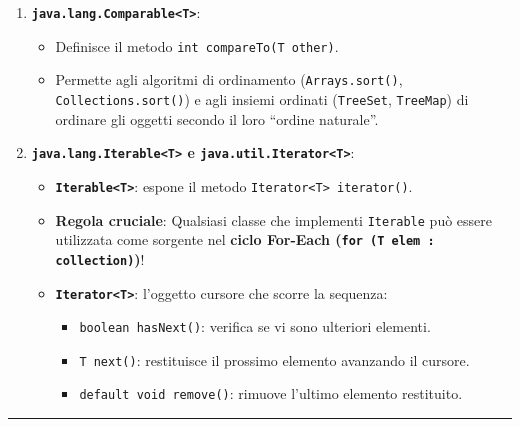 \documentclass[11pt,a4paper,oneside]{report}
\newcommand{\passthrough}[1]{#1}
\providecommand{\tightlist}{\setlength{\itemsep}{0pt}\setlength{\parskip}{0pt}}
\begin{document}
\begin{enumerate}
\def\labelenumi{\arabic{enumi}.}
\tightlist
\item
  \textbf{\passthrough{\lstinline!java.lang.Comparable<T>!}}:

  \begin{itemize}
  \tightlist
  \item
    Definisce il metodo
    \passthrough{\lstinline!int compareTo(T other)!}.
  \item
    Permette agli algoritmi di ordinamento
    (\passthrough{\lstinline!Arrays.sort()!},
    \passthrough{\lstinline!Collections.sort()!}) e agli insiemi
    ordinati (\passthrough{\lstinline!TreeSet!},
    \passthrough{\lstinline!TreeMap!}) di ordinare gli oggetti secondo
    il loro ``ordine naturale''.
  \end{itemize}
\item
  \textbf{\passthrough{\lstinline!java.lang.Iterable<T>!} e
  \passthrough{\lstinline!java.util.Iterator<T>!}}:

  \begin{itemize}
  \tightlist
  \item
    \textbf{\passthrough{\lstinline!Iterable<T>!}}: espone il metodo
    \passthrough{\lstinline!Iterator<T> iterator()!}.
  \item
    \textbf{Regola cruciale}: Qualsiasi classe che implementi
    \passthrough{\lstinline!Iterable!} può essere utilizzata come
    sorgente nel \textbf{ciclo For-Each
    (\passthrough{\lstinline!for (T elem : collection)!})}!
  \item
    \textbf{\passthrough{\lstinline!Iterator<T>!}}: l'oggetto cursore
    che scorre la sequenza:

    \begin{itemize}
    \tightlist
    \item
      \passthrough{\lstinline!boolean hasNext()!}: verifica se vi sono
      ulteriori elementi.
    \item
      \passthrough{\lstinline!T next()!}: restituisce il prossimo
      elemento avanzando il cursore.
    \item
      \passthrough{\lstinline!default void remove()!}: rimuove l'ultimo
      elemento restituito.
    \end{itemize}
  \end{itemize}
\end{enumerate}

\begin{center}\rule{0.5\linewidth}{0.5pt}\end{center}
\end{document}
